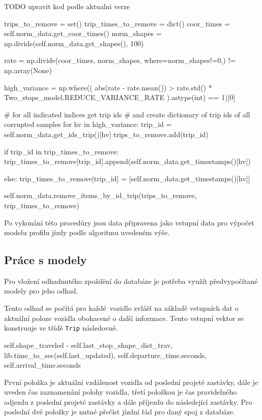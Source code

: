 TODO upravit kod podle aktualni verze
\begin{code}[frame=none]
trips_to_remove = set()
trip_times_to_remove = dict()
coor_times = self.norm_data.get_coor_times()
norm_shapes = np.divide(self.norm_data.get_shapes(), 100)

rate = np.divide(coor_times, norm_shapes, where=norm_shapes!=0,) != np.array(None)

high_variance = np.where((
    abs(rate - rate.mean()) > rate.std() * Two_stops_model.REDUCE_VARIANCE_RATE
  ).astype(int) == 1)[0]

# for all indicated indices get trip ids
# and create dictionary of trip ids of all corrupted samples
for hv in high_variance:
  trip_id = self.norm_data.get_ids_trip()[hv]
  trips_to_remove.add(trip_id)

  if trip_id in trip_times_to_remove:
    trip_times_to_remove[trip_id].append(self.norm_data.get_timestamps()[hv])

  else:
    trip_times_to_remove[trip_id] = [self.norm_data.get_timestamps()[hv]]

self.norm_data.remove_items_by_id_trip(trips_to_remove, trip_times_to_remove)
\end{code}

\bigbreak

Po vykonání této procedůry jsou data připravena jako vstupní data pro výpočet modelu profilu jízdy podle algoritmu uvedeném výše.

\subsection{Práce s modely}

Pro vložení odhadnutého zpoždění do databáze je potřeba využít předvypočítané modely pro jeho odhad.

\bigbreak

Tento odhad se počítá pro každé vozidlo zvlášť na základě vstupních dat o aktuální poloze vozidla obohacené o další informace. Tento vstupní vektor se konstruuje ve třídě \verb-Trip- následovně.

\begin{code}[frame=none]
self.shape_traveled - self.last_stop_shape_dist_trav,
lib.time_to_sec(self.last_updated),
self.departure_time.seconds,
self.arrival_time.seconds
\end{code}

\bigbreak

První položka je aktuální vzdálenost vozidla od poslední projeté zastávky, dále je uveden čas zaznamenání polohy vozidla, třetí položkou je čas pravidelného odjezdu z poslední projeté zastávky a dále příjezdu do následející zastávky. Pro poslední dvě položky je nutné přečíst jízdní řád pro daný spoj z databáze.

